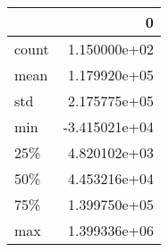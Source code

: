 \begin{tabular}{lr}
\toprule
{} &             0 \\
\midrule
count &  1.150000e+02 \\
mean  &  1.179920e+05 \\
std   &  2.175775e+05 \\
min   & -3.415021e+04 \\
25\%   &  4.820102e+03 \\
50\%   &  4.453216e+04 \\
75\%   &  1.399750e+05 \\
max   &  1.399336e+06 \\
\bottomrule
\end{tabular}
